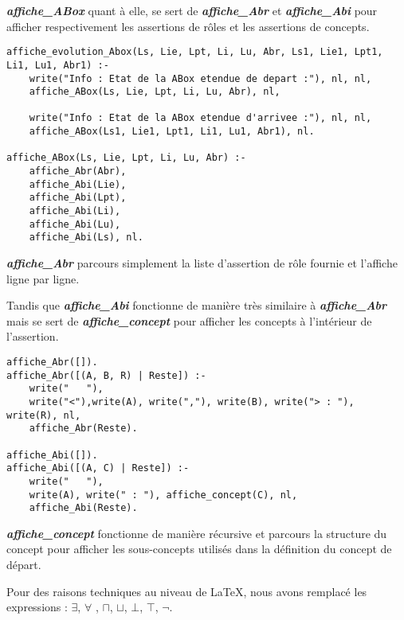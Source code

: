 \documentclass{rapportECL}
\begin{document}
\textbf{\textit{affiche\_ABox}} quant à elle, se sert de \textbf{\textit{affiche\_Abr}} et \textbf{\textit{affiche\_Abi}} pour afficher respectivement les assertions de rôles et les assertions de concepts.

\begin{lstlisting}[style=prologStyle, caption={Affichage de l'état de la ABox avant et après l'application d'une règle de résolution}, label={AffichageAbox}]
affiche_evolution_Abox(Ls, Lie, Lpt, Li, Lu, Abr, Ls1, Lie1, Lpt1, Li1, Lu1, Abr1) :-
    write("Info : Etat de la ABox etendue de depart :"), nl, nl,
    affiche_ABox(Ls, Lie, Lpt, Li, Lu, Abr), nl,

    write("Info : Etat de la ABox etendue d'arrivee :"), nl, nl,
    affiche_ABox(Ls1, Lie1, Lpt1, Li1, Lu1, Abr1), nl.

affiche_ABox(Ls, Lie, Lpt, Li, Lu, Abr) :-
    affiche_Abr(Abr),
    affiche_Abi(Lie),
    affiche_Abi(Lpt),
    affiche_Abi(Li),
    affiche_Abi(Lu),
    affiche_Abi(Ls), nl.
\end{lstlisting}

\textbf{\textit{affiche\_Abr}} parcours simplement la liste d'assertion de rôle fournie et l'affiche ligne par ligne.

Tandis que \textbf{\textit{affiche\_Abi}} fonctionne de manière très similaire à \textbf{\textit{affiche\_Abr}} mais se sert de \textbf{\textit{affiche\_concept}} pour afficher les concepts à l'intérieur de l'assertion.

\newpage

\begin{lstlisting}[style=prologStyle, caption={Affichage d'une liste d'assertion}, label={AffichageListeAssertion}]
affiche_Abr([]).
affiche_Abr([(A, B, R) | Reste]) :-
    write("   "),
    write("<"),write(A), write(","), write(B), write("> : "), write(R), nl,
    affiche_Abr(Reste).

affiche_Abi([]).
affiche_Abi([(A, C) | Reste]) :-
    write("   "),
    write(A), write(" : "), affiche_concept(C), nl,
    affiche_Abi(Reste).
\end{lstlisting}


\textbf{\textit{affiche\_concept}} fonctionne de manière récursive et parcours la structure du concept pour afficher les sous-concepts utilisés dans la définition du concept de départ.

Pour des raisons techniques au niveau de LaTeX, nous avons remplacé les expressions : \textit{\( \exists \)}, \textit{\( \forall \) }, \textit{\( \sqcap \)}, \textit{\( \sqcup \)}, \textit{\( \bot \)}, \textit{\( \top \)}, \textit{\( \neg \)}.
\end{document}
